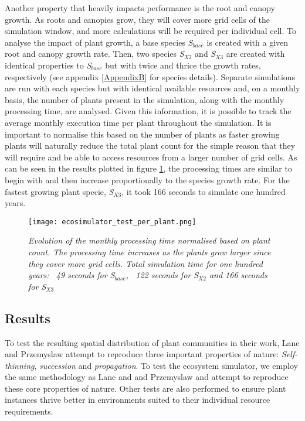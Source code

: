 Another property that heavily impacts performance is the root and canopy growth. As roots and canopies grow, they will cover more grid cells of the simulation window, and more calculations will be required per individual cell. To analyse the impact of plant growth, a base species \textit{S$_{base}$} is created with a given root and canopy growth rate. Then, two species \textit{S$_{X2}$} and \textit{S$_{X3}$} are created with identical properties to \textit{S$_{base}$} but with twice and thrice the growth rates, respectively (see appendix \ref{AppendixB} for species details). Separate simulations are run with each species but with identical available resources and, on a monthly basis, the number of plants present in the simulation, along with the monthly processing time, are analysed. Given this information, it is possible to track the average monthly execution time per plant throughout the simulation. It is important to normalise this based on the number of plants as faster growing plants will naturally reduce the total plant count for the simple reason that they will require and be able to access resources from a larger number of grid cells. As can be seen in the results plotted in figure \ref{fig:ecosimulator_test_per_plant}, the processing times are similar to begin with and then increase proportionally to the species growth rate. For the fastest growing plant specie, \textit{S$_{X3}$}, it took 166 seconds to simulate one hundred years.

\begin{figure}
\center
	\texttt{[image: ecosimulator\_test\_per\_plant.png]}
	\caption{ \textit{Evolution of the monthly processing time normalised based on plant count. The processing time increases as the plants grow larger since they cover more grid cells. Total simulation time for one hundred years: ~49 seconds for \textit{S$_{base}$}, ~122 seconds for \textit{S$_{X2}$} and 166 seconds for \textit{S$_{X3}$}}}
	\label{fig:ecosimulator_test_per_plant}
\end{figure}

\subsection{Results} \label{subsec:ecosystem_simulator_results}

To test the resulting spatial distribution of plant communities in their work, Lane and Przemyslaw \cite{Lane2002} attempt to reproduce three important properties of nature: \textit{Self-thinning}, \textit{succession} and \textit{propagation}. To test the ecosystem simulator, we employ the same methodology as Lane and and Przemyslaw \cite{Lane2002} and attempt to reproduce these core properties of nature. Other tests are also performed to ensure plant instances thrive better in environments suited to their individual resource requirements.\\

